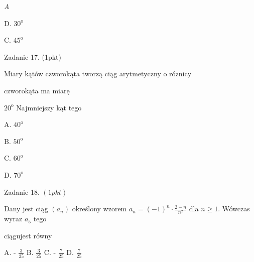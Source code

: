 \documentclass[a4paper,12pt]{article}
\begin{document}
{\it A}

D. $30^{\mathrm{o}}$

C. $45^{\mathrm{o}}$

Zadanie 17. (1pkt)

Miary kątów czworokąta tworzą ciąg arytmetyczny o róznicy

czworokąta ma miarę

$20^{\mathrm{o}}$ Najmniejszy kąt tego

A. $40^{\mathrm{o}}$

B. $50^{\mathrm{o}}$

C. $60^{\mathrm{o}}$

D. $70^{\mathrm{o}}$

Zadanie 18. $(1pkt)$

Dany jest ciąg $(a_{n})$ określony wzorem $a_{n}=(-1)^{n}\displaystyle \cdot\frac{2-n}{n^{2}}$ dla $n\geq 1$. Wówczas wyraz $a_{5}$ tego

ciągujest równy

A. - $\displaystyle \frac{3}{25}$ B. $\displaystyle \frac{3}{25}$ C. - $\displaystyle \frac{7}{25}$ D. $\displaystyle \frac{7}{25}$
\end{document}
